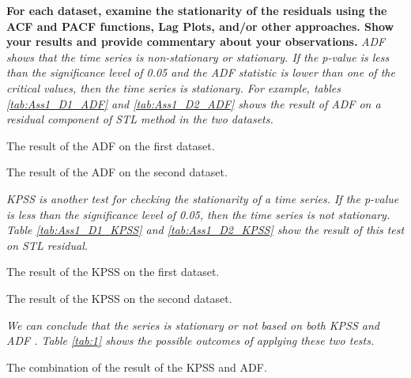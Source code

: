 \item \textbf{For each dataset, examine the stationarity of the residuals using the ACF and PACF functions, Lag Plots, and/or other approaches. Show your results and provide commentary about your observations.}
\label{Q3}
\textit{\gls{ADF} shows that the time series is non-stationary or stationary. If the p-value is less than the significance level of 0.05 and the \gls{ADF} statistic is lower than one of the critical values, then the time series is stationary. For example, tables \ref{tab:Ass1_D1_ADF} and \ref{tab:Ass1_D2_ADF} shows the result of \gls{ADF} on a residual component of STL method in the two datasets.}

\begin{table}[H]
\centering
\caption{The result of the \gls{ADF} on the first dataset.}
\label{tab:Ass1_D1_ADF}

\end{table}

\begin{table}[H]
\centering
\caption{The result of the \gls{ADF} on the second dataset.}
\label{tab:Ass1_D2_ADF}

\end{table}



\textit{\gls{KPSS} is another test for checking the stationarity of a time series. If the p-value is less than the significance level of 0.05, then the time series is not stationary. Table \ref{tab:Ass1_D1_KPSS} and \ref{tab:Ass1_D2_KPSS} show the result of this test on STL residual.}

\begin{table}[H]
\centering
\caption{The result of the \gls{KPSS} on the first dataset.}
\label{tab:Ass1_D1_KPSS}

\end{table}

\begin{table}[H]
\centering
\caption{The result of the \gls{KPSS} on the second dataset.}
\label{tab:Ass1_D2_KPSS}

\end{table}

\textit{We can conclude that the series is stationary or not based on both \gls{KPSS} and \gls{ADF} \cite{StationarityStatsmodels}. Table \ref{tab:1} shows the possible outcomes of applying these two tests.}

\begin{table}[H]
\centering
\caption{The combination of the result of the \gls{KPSS} and \gls{ADF}.}
\label{tab:1}

\end{table}



